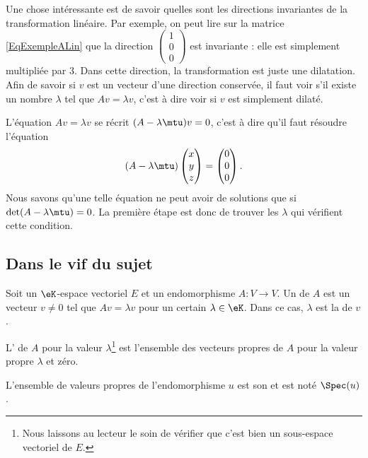 Une chose intéressante est de savoir quelles sont les directions invariantes de la transformation linéaire. Par exemple, on peut lire sur la matrice \eqref{EqExempleALin} que la direction $\begin{pmatrix}
	1	\\
	0	\\
	0
\end{pmatrix}$ est invariante : elle est simplement multipliée par $3$. Dans cette direction, la transformation est juste une dilatation. Afin de savoir si $v$ est un vecteur d'une direction conservée, il faut voir s'il existe un nombre $\lambda$ tel que $Av=\lambda v$, c'est à dire voir si $v$ est simplement dilaté.

L'équation $Av=\lambda v$ se récrit $(A-\lambda\mtu)v=0$, c'est à dire qu'il faut résoudre l'équation
\begin{equation}
	(A-\lambda\mtu)\begin{pmatrix}
		x	\\
		y	\\
		z
	\end{pmatrix}=
	\begin{pmatrix}
		0	\\
		0	\\
		0
	\end{pmatrix}.
\end{equation}
Nous savons qu'une telle équation ne peut avoir de solutions que si $\det(A-\lambda\mtu)=0$. La première étape est donc de trouver les $\lambda$ qui vérifient cette condition.

\subsection{Dans le vif du sujet}

\begin{definition}      \label{DefooMMKZooVcskCc}
    Soit un \( \eK\)-espace vectoriel \( E\) et un endomorphisme \( A\colon V\to V\). Un  de \( A\) est un vecteur \( v \neq 0\) tel que \( Av=\lambda v\) pour un certain \( \lambda\in \eK\). Dans ce cas, \( \lambda\) est la  de \( v\).

    L' de \( A\) pour la valeur \( \lambda\)\footnote{Nous laissons au lecteur le soin de vérifier que c'est bien un sous-espace vectoriel de \( E\).} est l'ensemble des vecteurs propres de \( A\) pour la valeur propre \( \lambda\) et zéro.
\end{definition}
L'ensemble de valeurs propres de l'endomorphisme \( u\) est son  et est noté \( \Spec(u)\).

